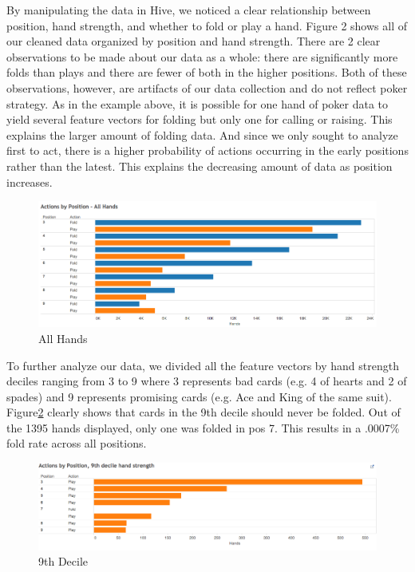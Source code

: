 \documentclass[twoside]{article}
\begin{document}
\begin{multicols}{2}
By manipulating the data in Hive, we noticed a clear relationship between position, hand strength, and whether to fold or play a hand. Figure 2 shows all of our cleaned data organized by position and hand strength. There are 2 clear observations to be made about our data as a whole: there are significantly more folds than plays and there are fewer of both in the higher positions. Both of these observations, however, are artifacts of our data collection and do not reflect poker strategy. As in the example above, it is possible for one hand of poker data to yield several feature vectors for folding but only one for calling or raising. This explains the larger amount of folding data. And since we only sought to analyze first to act, there is a higher probability of actions occurring in the early positions rather than the latest. This explains the decreasing amount of data as position increases.

\begin{figure}[H]
  \centering
  \centerline{\includegraphics[width=1.1\columnwidth]{Allhands.png}}
   \caption{All Hands}
  \label{fig:allHands}
\end{figure}

To further analyze our data, we divided all the feature vectors by hand strength deciles ranging from 3 to 9 where 3 represents bad cards (e.g. 4 of hearts and 2 of spades) and 9 represents promising cards (e.g. Ace and King of the same suit). Figure\ref{fig:9thDecile} clearly shows that cards in the 9th decile should never be folded. Out of the 1395 hands displayed, only one was folded in pos 7. This results in a .0007\% fold rate across all positions. 

\begin{figure}[H]
  \centering
  \centerline{\includegraphics[width=1.1\columnwidth]{9thDecile.png}}
   \caption{9th Decile}
  \label{fig:9thDecile}
\end{figure}


\end{multicols}
\end{document}
